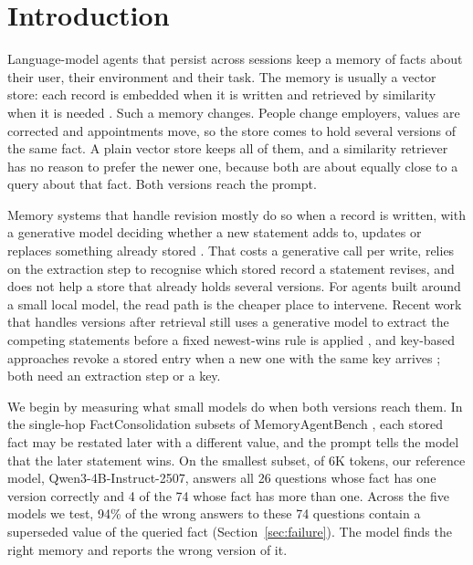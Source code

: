 \documentclass{CUP-JNL-NLP}
\begin{document}
\section{Introduction}
\label{sec:intro}

Language-model agents that persist across sessions keep a memory of facts about their user, their environment and their task. The memory is usually a vector store: each record is embedded when it is written and retrieved by similarity when it is needed \citep{lewis2020retrieval,packer2023memgpt,park2023generative,church2024emerging,zhang2025survey}.
Such a memory changes. People change employers, values are corrected and appointments move, so the store comes to hold several versions of the same fact. A plain vector store keeps all of them, and a similarity retriever has no reason to prefer the newer one, because both are about equally close to a query about that fact. Both versions reach the prompt.

Memory systems that handle revision mostly do so when a record is written, with a generative model deciding whether a new statement adds to, updates or replaces something already stored \citep{chhikara2025mem0,xu2025amem,rasmussen2025zep,kang2025memoryos,yan2026memoryr1}.
That costs a generative call per write, relies on the extraction step to recognise which stored record a statement revises, and does not help a store that already holds several versions. For agents built around a small local model, the read path is the cheaper place to intervene. Recent work that handles versions after retrieval still uses a generative model to extract the competing statements before a fixed newest-wins rule is applied \citep{reddy2026reliable}, and key-based approaches revoke a stored entry when a new one with the same key arrives \citep{zhou2026tepa}; both need an extraction step or a key.

We begin by measuring what small models do when both versions reach them. In the single-hop FactConsolidation subsets of MemoryAgentBench \citep{hu2026memoryagentbench}, each stored fact may be restated later with a different value, and the prompt tells the model that the later statement wins. On the smallest subset, of 6K tokens, our reference model, Qwen3-4B-Instruct-2507, answers all 26 questions whose fact has one version correctly and 4 of the 74 whose fact has more than one. Across the five models we test, 94\% of the wrong answers to these 74 questions contain a superseded value of the queried fact (Section~\ref{sec:failure}). The model finds the right memory and reports the wrong version of it.
\end{document}
